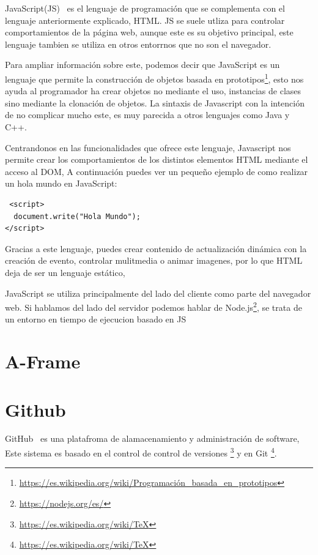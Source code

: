 \documentclass[a4paper, 12pt]{book}
\begin{document}
JavaScript(JS)~\cite{eloquent} es el lenguaje de programación que se complementa con el lenguaje anteriormente explicado, HTML. JS se suele utliza para controlar comportamientos de la página web, aunque este es su objetivo principal, este lenguaje tambien se utiliza en otros entorrnos que no son el navegador.

Para ampliar información sobre este, podemos decir que JavaScript es un lenguaje que permite la construcción de objetos basada en prototipos\footnote{\url{https://es.wikipedia.org/wiki/Programación_basada_en_prototipos}}, esto nos ayuda al programador ha crear objetos no mediante el uso, instancias de clases sino mediante la clonación de objetos. La sintaxis de Javascript con la intención de no complicar mucho este, es muy parecida a otros lenguajes como Java y C++.

Centrandonos en las funcionalidades que ofrece este lenguaje, Javascript nos permite crear los comportamientos de los distintos elementos  HTML mediante el acceso al DOM, A continuación puedes ver un pequeño ejemplo de como realizar un hola mundo en JavaScript:


\begin{verbatim}
 <script>
  document.write("Hola Mundo");
</script>   
\end{verbatim}

Gracias a este lenguaje, puedes crear contenido de actualización dinámica con la creación de evento, controlar mulitmedia o animar imagenes, por lo que HTML deja de ser un lenguaje estático, 

JavaScript se utiliza principalmente del lado del cliente como parte del navegador web. Si hablamos del lado del servidor podemos hablar de Node.js\footnote{\url{https://nodejs.org/es/}}, se trata de un entorno  en tiempo de ejecucion basado en JS



\section{A-Frame} %
\label{sec:A-Frame}


\section{Github} %
\label{sec:GitHub}
GitHub~\cite{GITHUB} es una platafroma de alamacenamiento y administración  de software, Este sistema es basado en el control de control de versiones \footnote{\url{https://es.wikipedia.org/wiki/TeX}} y en Git \footnote{\url{https://es.wikipedia.org/wiki/TeX}}.
\end{document}
